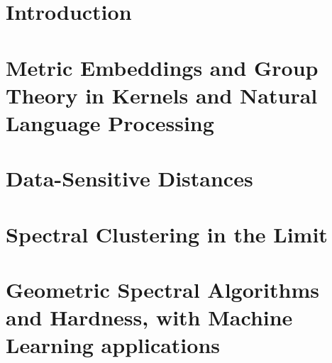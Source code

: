 \documentclass[12pt]{cmuthesis}
\begin{document}
\chapter{Introduction}

\chapter{Metric Embeddings and Group Theory in Kernels and Natural Language
Processing}\label{sec:ker-main}

\chapter{Data-Sensitive Distances}\label{sec:ds-main}

\chapter{Spectral Clustering in the Limit}\label{sec:spec-main}

\chapter{Geometric Spectral Algorithms and Hardness, with Machine
Learning applications}\label{sec:sgt-main}

%
%

%

% 
% 
 
% 
\end{document}
